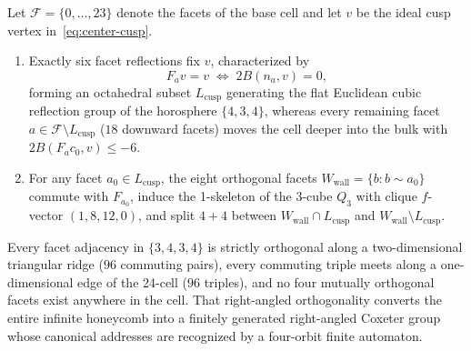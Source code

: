\begin{proposition}
\label{prop:cusp-wall}
Let $\mathcal{F} = \{0,\dots,23\}$ denote the facets of the base cell and let $v$ be the ideal cusp vertex in~\eqref{eq:center-cusp}.
\begin{enumerate}
\item Exactly six facet reflections fix $v$, characterized by
\begin{equation}
\label{eq:cusp-fix}
F_a v = v \;\Longleftrightarrow\; 2B(n_a, v) = 0,
\end{equation}
forming an octahedral subset $L_{\mathrm{cusp}}$ generating the flat Euclidean cubic reflection group of the horosphere $\{4,3,4\}$, whereas every remaining facet $a \in \mathcal{F} \setminus L_{\mathrm{cusp}}$ ($18$ downward facets) moves the cell deeper into the bulk with $2B(F_a c_0, v) \le -6$.
\item For any facet $a_0 \in L_{\mathrm{cusp}}$, the eight orthogonal facets $W_{\mathrm{wall}} = \{b : b \sim a_0\}$ commute with $F_{a_0}$, induce the 1-skeleton of the 3-cube $Q_3$ with clique $f$-vector $(1,8,12,0)$, and split $4 + 4$ between $W_{\mathrm{wall}} \cap L_{\mathrm{cusp}}$ and $W_{\mathrm{wall}} \setminus L_{\mathrm{cusp}}$.
\end{enumerate}
\end{proposition}

Every facet adjacency in $\{3,4,3,4\}$ is strictly orthogonal along a two-dimensional triangular ridge ($96$ commuting pairs), every commuting triple meets along a one-dimensional edge of the 24-cell ($96$ triples), and no four mutually orthogonal facets exist anywhere in the cell. That right-angled orthogonality converts the entire infinite honeycomb into a finitely generated right-angled Coxeter group whose canonical addresses are recognized by a four-orbit finite automaton.
